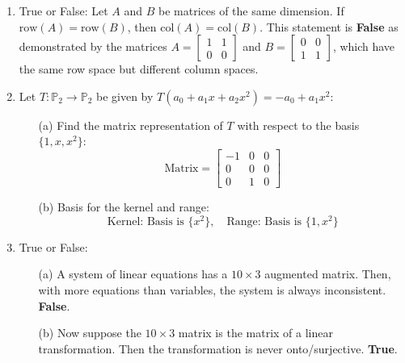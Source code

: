 \documentclass{article}
\begin{document}
\begin{enumerate}
    \item True or False: Let $A$ and $B$ be matrices of the same dimension. If $\text{row}(A) = \text{row}(B)$, then $\text{col}(A) = \text{col}(B)$. This statement is \textbf{False} as demonstrated by the matrices $A = \begin{bmatrix} 1 & 1 \\ 0 & 0 \end{bmatrix}$ and $B = \begin{bmatrix} 0 & 0 \\ 1 & 1 \end{bmatrix}$, which have the same row space but different column spaces.

    \item Let $T: \mathbb{P}_2 \rightarrow \mathbb{P}_2$ be given by $T(a_0 + a_1x + a_2x^2) = -a_0 + a_1x^2$:
    \begin{itemize}
        \item[(a)] Find the matrix representation of $T$ with respect to the basis $\{1, x, x^2\}$:
        \[
        \text{Matrix} = \begin{bmatrix} -1 & 0 & 0 \\ 0 & 0 & 0 \\ 0 & 1 & 0 \end{bmatrix}
        \]
        \item[(b)] Basis for the kernel and range:
        \[
        \text{Kernel: Basis is } \{x^2\}, \quad \text{Range: Basis is } \{1, x^2\}
        \]
    \end{itemize}

    \item True or False:
    \begin{itemize}
        \item[(a)] A system of linear equations has a $10 \times 3$ augmented matrix. Then, with more equations than variables, the system is always inconsistent. \textbf{False}.
        \item[(b)] Now suppose the $10 \times 3$ matrix is the matrix of a linear transformation. Then the transformation is never onto/surjective. \textbf{True}.
    \end{itemize}


\end{enumerate}
\end{document}
